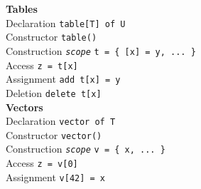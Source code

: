 \documentclass[10pt,landscape]{article}
\newcommand{\minisec}[1]{\textbf{#1}\\}
\begin{document}
\begin{multicols*}{3}
\minisec{Tables}
Declaration \dotfill \verb|table[T] of U|\\
Constructor \dotfill \verb|table()|\\
Construction \dotfill \texttt{\textit{scope}} \verb|t = { [x] = y, ... }|\\
Access \dotfill \verb|z = t[x]|\\
Assignment \dotfill \verb|add t[x] = y|\\
Deletion \dotfill \verb|delete t[x]|\\

\minisec{Vectors}
Declaration \dotfill \verb|vector of T|\\
Constructor \dotfill \verb|vector()|\\
Construction \dotfill \texttt{\textit{scope}} \verb|v = { x, ... }|\\
Access \dotfill \verb|z = v[0]|\\
Assignment \dotfill \verb|v[42] = x|\\
\end{multicols*}
\end{document}
